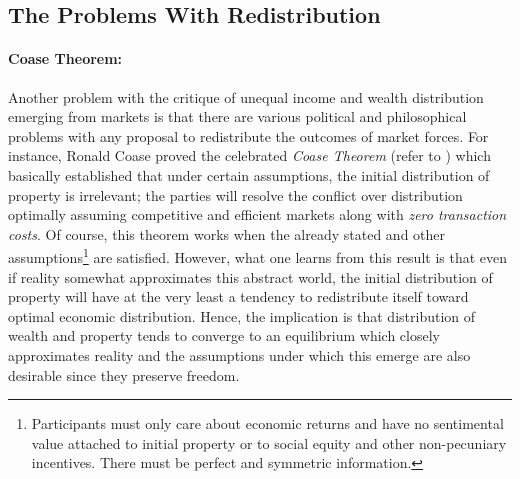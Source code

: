 \documentclass[12pt]{article}
\newcommand{\1}{\mathbbm 1}
\begin{document}
			
		
	
		\subsection{The Problems With Redistribution}
		
		
		\paragraph{Coase Theorem:} Another problem with the critique of unequal income and wealth distribution emerging from markets is that there are various political and philosophical problems with any proposal to redistribute the outcomes of market forces. For instance, Ronald Coase proved the celebrated \textit{Coase Theorem} (refer to \cite{coase1981coase}) which basically established that under certain assumptions, the initial distribution of property is irrelevant; the parties will resolve the conflict over distribution optimally assuming competitive and efficient markets along with \textit{zero transaction costs}. Of course, this theorem works when the already stated and other assumptions\footnote{Participants must only care about economic returns and have no sentimental value attached to initial property or to social equity and other non-pecuniary incentives. There must be perfect and symmetric information.} are satisfied. However, what one learns from this result is that even if reality somewhat approximates this abstract world, the initial distribution of property will have at the very least a tendency to redistribute itself toward optimal economic distribution. Hence, the implication is that distribution of wealth and property tends to converge to an equilibrium which closely approximates reality and the assumptions under which this emerge are also desirable since they preserve freedom.
		
\end{document}

